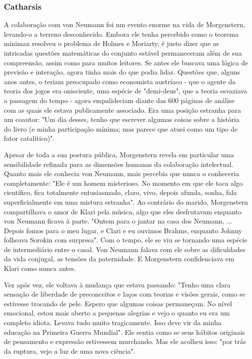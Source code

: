 \documentclass[a4paper,12pt]{article}[abntex2]
\begin{document}
\subsubsection{\textbf{Catharsis}}
A colaboração com von Neumann foi um evento enorme na vida de Morgenstern, levando-o a terreno desconhecido. Embora ele tenha percebido como o teorema minimax resolveu o problema de Holmes e Moriarty, é justo dizer que as intricadas questões matemáticas do conjunto estável permaneceram além de sua compreensão, assim como para muitos leitores. Se antes ele buscava uma lógica de previsão e interação, agora tinha mais do que podia lidar. Questões que, alguns anos antes, o teriam preocupado como economista austríaco - que o agente da teoria dos jogos era onisciente, uma espécie de "demi-deus", que a teoria esvaziava a passagem do tempo - agora empalideciam diante das 600 páginas de análise com as quais ele estava publicamente associado. Era uma posição estranha para um coautor: "Um dia desses, tenho que escrever algumas coisas sobre a história do livro (e minha participação mínima; mas parece que atuei como um tipo de fator catalítico)".

Apesar de toda a sua postura pública, Morgenstern revela em particular uma sensibilidade refinada para as dimensões humanas da colaboração intelectual. Quanto mais ele conhecia von Neumann, mais percebia que nunca o conheceria completamente: "Ele é um homem misterioso. No momento em que ele toca algo científico, fica totalmente entusiasmado, claro, vivo, depois afunda, sonha, fala superficialmente em uma mistura estranha". Ao contrário do marido, Morgenstern compartilhava o amor de Klari pela música, algo que eles desfrutavam enquanto von Neumann ficava à parte. "Ontem para o jantar na casa dos Neumann, ... Depois fomos para o meu lugar, e Clari e eu ouvimos Brahms, enquanto Johnny folheava Sorokin com surpresa". Com o tempo, ele se viu se tornando uma espécie de intermediário entre o casal. Von Neumann falava com ele sobre as dificuldades da vida conjugal, as tensões da paternidade. E Morgenstern confidenciava em Klari como nunca antes.

Vez após vez, ele voltava à mudança que estava passando: "Tenho uma clara sensação de liberdade de preconceitos e laços com teorias e visões gerais, como se estivesse trocando de pele. Espero que algumas coisas permaneçam. No nível emocional, estou mais aberto a pequenas alegrias e vejo o quanto eu era um completo idiota. Levava tudo muito tragicamente. Isso deve vir da minha educação na Primeira Guerra Mundial". Ele sentia como se seus hábitos originais de pensamento e expressão estivessem murchando. Mas ele acolheu isso: "por trás da ruptura, vejo a luz de uma nova ciência".
\end{document}
